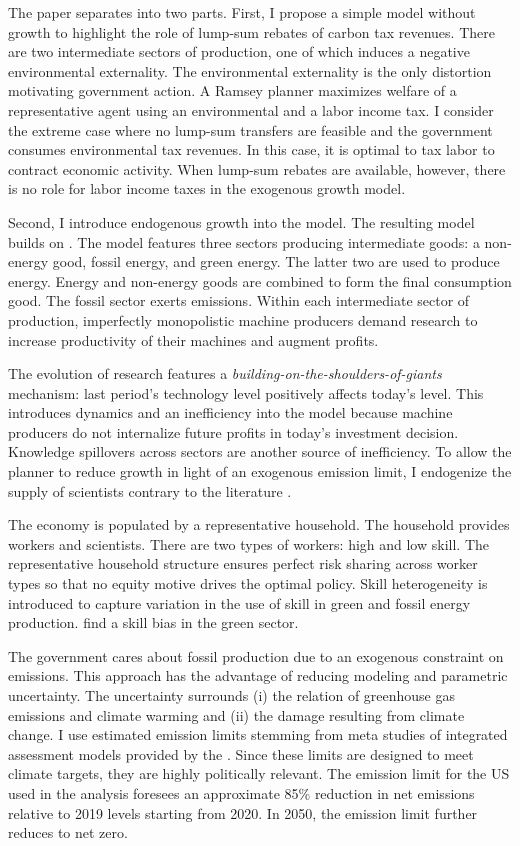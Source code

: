 The paper separates into two parts. First, I propose a simple model without growth to highlight the role of lump-sum rebates of carbon tax revenues. There are two intermediate sectors of production, one of which induces a negative environmental externality. The environmental externality is the only distortion motivating government action. A Ramsey planner maximizes welfare of a representative agent using an environmental and a labor income tax. I consider the extreme case where no lump-sum transfers are feasible and the government consumes environmental tax revenues. In this case, it is optimal to tax labor to contract economic activity. When lump-sum rebates are available, however, there is no role for labor income taxes in the exogenous growth model. 

Second, I introduce endogenous growth into the model. The resulting model builds on \cite{Fried2018ClimateAnalysis}. The model features three sectors producing intermediate goods:  a non-energy good, fossil energy, and green energy. The latter two are used to produce energy. Energy and non-energy goods are combined to form the final consumption good. The fossil sector exerts emissions. Within each intermediate sector of production, imperfectly monopolistic machine producers demand research to increase productivity of their machines and augment profits.

The evolution of research features a \textit{building-on-the-shoulders-of-giants} mechanism: last period's technology level positively affects today's level. This introduces dynamics and an inefficiency into the model because machine producers do not internalize future profits in today's investment decision. Knowledge spillovers across sectors are another source of inefficiency. To allow the planner to reduce growth in light of an exogenous emission limit, I endogenize the supply of scientists contrary to the literature \citep{Acemoglu2012TheChange, Fried2018ClimateAnalysis}. 

The economy is populated by a representative household. The household provides workers and scientists. There are two types of workers: high and low skill. The representative household structure ensures perfect risk sharing across worker types so that no equity motive drives the optimal policy. 
Skill heterogeneity is introduced to capture variation in the use of skill in green and fossil energy production. \cite{Consoli2016DoCapital} find a skill bias in the green sector. 

The government cares about fossil production due to an exogenous constraint on emissions. This approach has the advantage of reducing modeling and parametric uncertainty. The uncertainty surrounds (i) the relation of greenhouse gas emissions and climate warming and (ii) the damage resulting from climate change. I use estimated emission limits stemming from meta studies of integrated assessment models provided by the \cite{IPCC2022}. Since these limits are designed to meet climate targets, they are highly politically relevant.  
The emission limit for the US used in the analysis foresees an approximate 85\% reduction in net emissions relative to 2019 levels starting from 2020. In 2050, the emission limit further reduces to net zero. 

